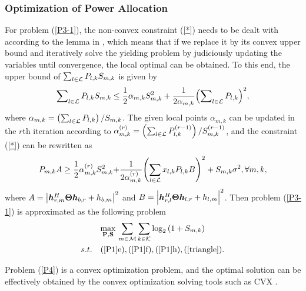 \documentclass[journal]{IEEEtran}
\begin{document}
\subsubsection{Optimization of Power Allocation}
For problem (\ref{P3-1}), the non-convex constraint (\ref{*}) needs to be dealt with according to the lemma in \cite{IRS-ARXIV-8-33}, which means that if we replace it by its convex upper bound and iteratively solve the yielding problem by judiciously updating the variables until convergence, the local optimal can be obtained. To this end, the upper bound of $ \sum\nolimits_{l \in {\cal L}} {{P_{l,k}}{S_{m,k}}} $ is given by 
\begin{equation}
	  \sum\nolimits_{l \in {\cal L}} {{P_{l,k}}{S_{m,k}}}  \le \frac{1}{2}{\alpha _{m,k}}S_{m,k}^2 + \frac{1}{{2{\alpha _{m,k}}}}{\left( {\sum\nolimits_{l \in {\cal L}} {{P_{l,k}}} } \right)^2} ,
\end{equation}
where $ {\alpha _{m,k}} = \left( {\sum\nolimits_{l \in {\cal L}} {{P_{l,k}}} } \right)/{S_{m,k}} $. The given local points $ {\alpha _{m,k}} $ can be updated in the $r$th iteration according to $ \alpha _{m,k}^{\left( r \right)} = \left( {\sum\nolimits_{l \in {\cal L}} {P_{l,k}^{\left( {r - 1} \right)}} } \right)/S_{m,k}^{\left( {r - 1} \right)} $, and the constraint (\ref{*}) can be rewritten as
\begin{equation}\label{triangle}
\small
\setlength\abovedisplayskip{1pt}
\setlength\belowdisplayskip{1pt}
	{P_{m,k}}A \ge \frac{1}{2}\alpha _{m,k}^{\left( r \right)}S_{m,k}^2{\rm{ + }}\frac{1}{{2\alpha _{m,k}^{\left( r \right)}}}{\left( {\sum\limits_{l \in {\cal L}} {{x_{l,k}}{P_{l,k}}} B} \right)^2} + {S_{m,k}}{\sigma ^2},\forall m,k,
\end{equation}
where $ A = {\left| {\bm{h}_{r,m}^H{\bf{\Theta }}{\bm{h}_{b,r}} + {h_{b,m}}} \right|^2} $ and $ B = {\left| {\bm{h}_{r,l}^H{\bf{\Theta }}{\bm{h}_{l,r}} + {h_{l,m}}} \right|^2}$. Then problem
(\ref{P3-1}) is approximated as the following problem
\begin{subequations}\label{P4}
	\begin{gather}
	\mathop {\max }\limits_{{\bf{P}},{\bf{S}}} {\rm{    }}\sum\limits_{m \in {\cal M}} {\sum\limits_{k \in {\cal K}} {{{\log }_2}\left( {1 + {S_{m,k}}} \right)} } \\
	s.t. \quad (\ref{P1}\rm{e}),(\ref{P1}\rm{f}),(\ref{P1}\rm{h}),(\ref{triangle}).
	\end{gather}
\end{subequations}

\noindent Problem (\ref{P4}) is a convex optimization problem, and the optimal solution can be effectively obtained by the convex optimization solving tools such as CVX \cite{book-Convex}.
\end{document}

